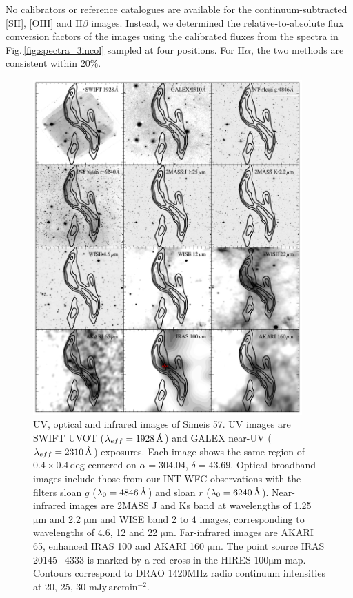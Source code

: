 \documentclass{aa}
\begin{document}
\par No calibrators or reference catalogues are available for the
continuum-subtracted [SII], [OIII] and H$\beta$ images. Instead, we
determined the relative-to-absolute flux conversion factors of the
images using the calibrated fluxes from the spectra in 
Fig.\,\ref{fig:spectra_3incol} sampled at four positions. For H$\alpha$, 
the two methods are consistent within $20\%$.


\begin{figure}
\includegraphics[width=0.92\textwidth]{ImageSpectrumSimeis_AKARI65.pdf}
\centering
\caption{UV, optical and infrared images of Simeis 57.  UV images are
  SWIFT UVOT ($\lambda_{eff} = 1928 \, \mathrm{\AA}$) and GALEX
  near-UV ($\lambda_{eff} = 2310 \, \mathrm{\AA}$) exposures. 
  Each image shows the same region of $0.4\times 0.4\,\mathrm{deg}$
  centered on $\alpha=304.04$, $\delta=43.69$. Optical broadband 
  images include those from our INT WFC observations with
  the filters sloan $g$ ($\lambda_{0} = 4846 \, \mathrm{\AA}$) and
  sloan $r$ ($\lambda_{0} = 6240 \, \mathrm{\AA}$).  Near-infrared
  images are 2MASS J and Ks band at wavelengths of 1.25
  $\mathrm{\mu m}$ and 2.2 $\mathrm{\mu m}$ and WISE band 2 to 4
  images, corresponding to wavelengths of 4.6, 12 and 22
  $\mathrm{\mu m}$.  Far-infrared images are AKARI 65, enhanced IRAS
  100 and AKARI 160 $\mathrm{\mu m}$.  The point source IRAS
  20145+4333 is marked by a red cross in the HIRES $100 \mathrm{\mu m}$
  map. Contours correspond to DRAO 1420MHz radio continuum
  intensities at 20, 25, 30 $\mathrm{mJy \, arcmin^{-2}}$.}
\label{fig:image_spectrum}
\end{figure}
\end{document}
